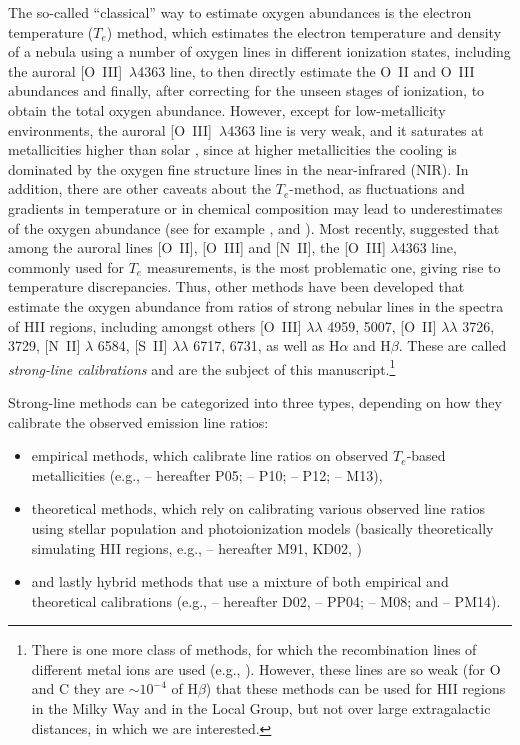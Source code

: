 \documentclass{emulateapj}
\begin{document}
The so-called ``classical'' way to estimate oxygen abundances is the
electron temperature ($T_e$) method, which estimates the electron
temperature and density of a nebula using a number of oxygen lines in
different ionization states, including the auroral
[O~III]~$\lambda$4363 line, to then directly estimate the O~II and
O~III abundances and finally, after correcting for the unseen stages
of ionization, to obtain the total oxygen abundance.
%
However, except for low-metallicity environments, the auroral
[O~III]~$\lambda$4363 line is very weak, and it saturates at
metallicities higher than solar \citep{stasinska02}, since at higher
metallicities the cooling is dominated by the oxygen fine structure
lines in the near-infrared (NIR).  In addition, there are other
caveats about the $T_e$-method, as fluctuations and gradients in
temperature or in chemical composition may lead to underestimates of
the oxygen abundance (see for example \citealt{peimbert67}, and
\citealt{lopezsanchez12}).  Most recently, \citet{berg15} suggested
that among the auroral lines [O~II], [O~III] and [N~II], the [O~III]
$\lambda$4363 line, commonly used for $T_e$ measurements, is the most
problematic one, giving rise to temperature discrepancies.  Thus,
other methods have been developed that estimate the oxygen abundance
from ratios of strong nebular lines in the spectra of HII regions,
including amongst others [O~III] $\lambda \lambda$ 4959, 5007, [O~II]
$\lambda \lambda$ 3726, 3729, [N~II] $\lambda$ 6584, [S~II] $\lambda
\lambda$ 6717, 6731, as well as H$\alpha$ and H$\beta$. These are
called \emph{strong-line calibrations} and are the subject of this
manuscript.\footnote{There is one more class of methods, for which the
  recombination lines of different metal ions are used (e.g.,
  \citealt{stasinska02,lopezsanchez12}). However, these lines are so
  weak (for O and C they are $\sim10^{-4}$ of H$\beta$) that these
  methods can be used for HII regions in the Milky Way and in the
  Local Group, but not over large extragalactic distances, in which we
  are interested.}


Strong-line methods can be categorized into three types, depending on
how they calibrate the observed emission line ratios:
\begin{itemize}
\item{ empirical methods, which calibrate line ratios on observed
  $T_e$-based metallicities (e.g., \citealt{pilyugin05} -- hereafter
  P05; \citealt{pilyugin10} -- P10; \citealt{pilyugin12} -- P12;
  \citealt{marino13} -- M13), }
\item{ theoretical methods, which rely on calibrating various observed
  line ratios using stellar population and photoionization models
  (basically theoretically simulating HII regions, e.g.,
  \citealt{mcgaugh91} -- hereafter M91, KD02,
  \citealt{tremonti04})}
\item{ and lastly hybrid methods that use a mixture of both empirical
  and theoretical calibrations (e.g., \citealt{denicolo02} -- hereafter
  D02, \citealt{pettini04} -- PP04; \citealt{maiolino08} -- M08; and
  \citealt{perezmontero14} -- PM14).  }
\end{itemize}
\end{document}
